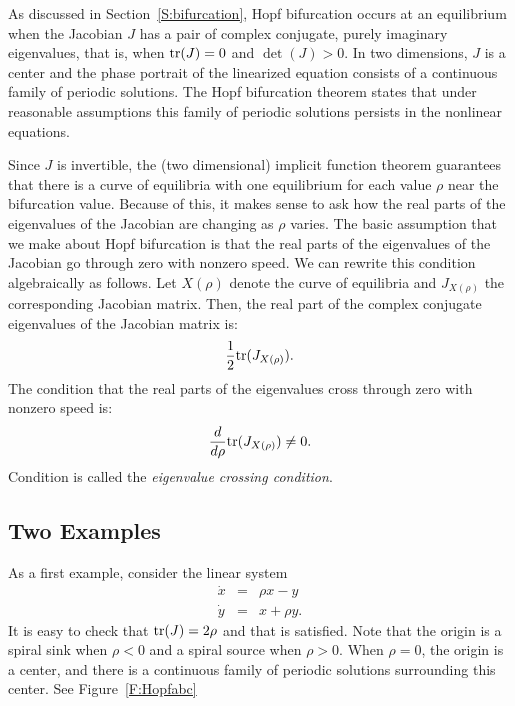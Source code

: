 \documentclass{ximera}
\begin{document}
\label{S:HopfBif}

As discussed in Section~\ref{S:bifurcation}, Hopf bifurcation occurs at
an equilibrium when the Jacobian $J$ has a pair of complex conjugate, purely 
imaginary eigenvalues, that is, when ${\rm tr}(J)=0$ and $\det(J)>0$.  In two 
dimensions, $J$ is a center and the phase portrait of the linearized equation 
consists of a continuous family of periodic solutions.  The Hopf bifurcation 
theorem states that under reasonable assumptions this family of periodic 
solutions persists in the nonlinear equations.   

Since $J$ is invertible, the (two dimensional) implicit function theorem 
guarantees that there is a curve of equilibria with one equilibrium for 
each value $\rho$ near the bifurcation value.  Because of this, it makes 
sense to ask how the real parts of the eigenvalues of the Jacobian are 
changing as $\rho$ varies.  The basic assumption that we make about Hopf 
bifurcation is that the real parts of the eigenvalues of the Jacobian go 
through zero with nonzero speed.  We can rewrite this condition algebraically 
as follows.  Let $X(\rho)$ denote the curve of equilibria and $J_{X(\rho)}$ 
the corresponding Jacobian matrix.  Then, the real part of the complex 
conjugate eigenvalues of the Jacobian matrix is: 
\[
\frac{1}{2}{\rm tr}(J_{X(\rho)}). 
\]
The condition that the real parts of the eigenvalues cross through 
zero with nonzero speed is:
\begin{equation}  \label{e:2dhopf}
\frac{d}{d\rho} \trace(J_{X(\rho)}) \neq 0.
\end{equation}
Condition  is called the {\em eigenvalue crossing condition\/}.


\subsection*{Two Examples}

As a first example, consider the linear system
\begin{equation*}  \label{e:Hopflin}
\begin{array}{rcl}
\dot{x} & = & \rho x - y \\
\dot{y} & = & x + \rho y.
\end{array}
\end{equation*}
It is easy to check that ${\rm tr}(J)=2\rho$ and that 
is satisfied.  Note that the origin is a spiral sink when $\rho<0$ 
and a spiral source when $\rho>0$.  When $\rho=0$, the origin is a
center, and there is a continuous family of periodic solutions
surrounding this center.  See Figure~\ref{F:Hopfabc}
\end{document}
